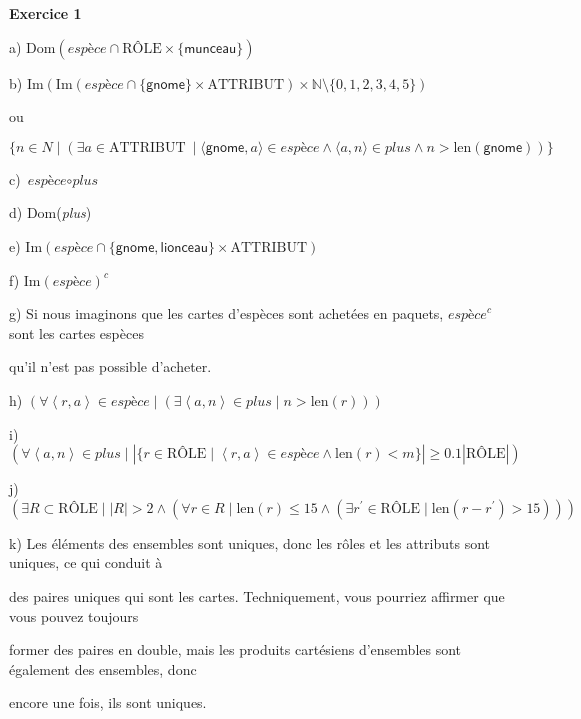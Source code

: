 \documentclass{article}
\newcommand{\role}{\mbox{RÔLE}}
\newcommand{\attribut}{\mbox{ATTRIBUT}}
\newcommand{\compose}{\circ}
\newcommand{\tuple}[1]{\ensuremath{\left\langle #1 \right\rangle}}
\begin{document}
\textbf{Exercice 1}

a) $\text{Dom}(\textit{espèce} \cap \role \times \{ \textsf{munceau} \} )$

\vspace{0.5cm}

b) $ \text{Im}( \text{Im}( \textit{espèce} \cap \{ \textsf{gnome} \} \times \attribut ) \times \mathbb{N} \setminus \{ 0,1,2,3,4,5 \} ) $ 

ou

$\{ n \in N \mid (\exists a \in \attribut\ \mid \langle \textsf{gnome},a  \rangle \in \textit{espèce} \land \langle a,n \rangle \in \textit{plus} \land n > \text{len}(\textsf{gnome}) )\}$

\vspace{0.5cm}

c) $\textit{espèce} \compose \textit{plus}$

\vspace{0.5cm}

d) Dom(\textit{plus})

\vspace{0.5cm}

e) $ \text{Im}(\textit{espèce} \cap \{ \textsf{gnome}, \textsf{lionceau} \} \times \attribut)$

\vspace{0.5cm}

f) $ \text{Im}(\textit{espèce})^{c} $

\vspace{0.5cm}

g) Si nous imaginons que les cartes d'espèces sont achetées en paquets, $\textit{espèce}^{c}$ sont les cartes espèces 

qu'il n'est pas possible d'acheter.

\vspace{0.5cm}

h) $( \forall \tuple{r,a} \in \textit{espèce} \mid ( \exists \tuple{a,n} \in \textit{plus} \mid n > \text{len}(r) ))$

\vspace{0.5cm}

i) $ (  \forall \tuple{a,n} \in \textit{plus} \mid |\{ r \in \role \mid \tuple{r,a} \in \textit{espèce} \land \text{len}(r) < m \}| \geq 0.1 | \role | ) $

\vspace{0.5cm}

j) $( \exists R \subset \role \mid |R| > 2 \land ( \forall r \in R \mid \text{len}(r) \leq 15 \land ( \exists r^{\prime} \in \role \mid \text{len}(r - r^{\prime}) > 15 ) ) ) $

\vspace{0.5cm}

k) Les éléments des ensembles sont uniques, donc les rôles et les attributs sont uniques, ce qui conduit à

des paires uniques qui sont les cartes. Techniquement, vous pourriez affirmer que vous pouvez toujours 

former des paires en double, mais les produits cartésiens d'ensembles sont également des ensembles, donc 

encore une fois, ils sont uniques.
\end{document}

